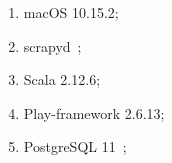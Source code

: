 \begin{enumerate}
        \item macOS 10.15.2;
        \item scrapyd~\cite{scrapyd};
        \item Scala 2.12.6;
        \item Play-framework 2.6.13;
        \item PostgreSQL 11~\cite{postgresql};
    \end{enumerate}
